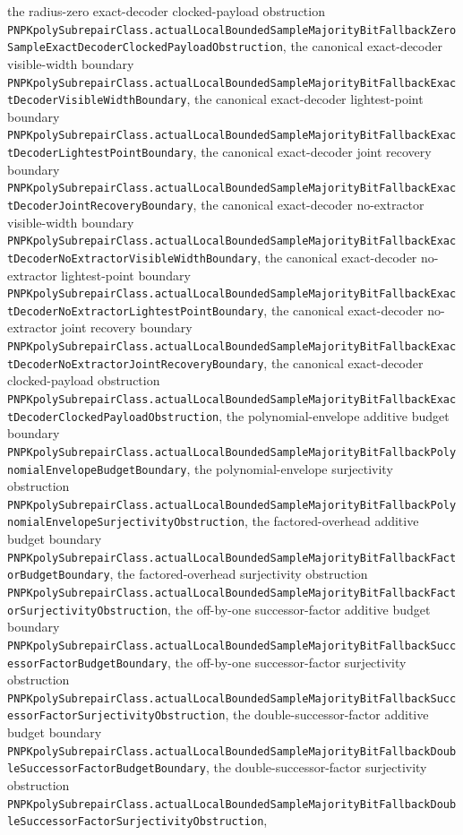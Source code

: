 \documentclass[11pt]{article}
\theoremstyle{remark}
\begin{document}
the radius-zero exact-decoder clocked-payload obstruction
\texttt{PNPKpolySubrepairClass.actualLocalBoundedSampleMajorityBitFallbackZeroSampleExactDecoderClockedPayloadObstruction},
the canonical exact-decoder visible-width boundary
\texttt{PNPKpolySubrepairClass.actualLocalBoundedSampleMajorityBitFallbackExactDecoderVisibleWidthBoundary},
the canonical exact-decoder lightest-point boundary
\texttt{PNPKpolySubrepairClass.actualLocalBoundedSampleMajorityBitFallbackExactDecoderLightestPointBoundary},
the canonical exact-decoder joint recovery boundary
\texttt{PNPKpolySubrepairClass.actualLocalBoundedSampleMajorityBitFallbackExactDecoderJointRecoveryBoundary},
the canonical exact-decoder no-extractor visible-width boundary
\texttt{PNPKpolySubrepairClass.actualLocalBoundedSampleMajorityBitFallbackExactDecoderNoExtractorVisibleWidthBoundary},
the canonical exact-decoder no-extractor lightest-point boundary
\texttt{PNPKpolySubrepairClass.actualLocalBoundedSampleMajorityBitFallbackExactDecoderNoExtractorLightestPointBoundary},
the canonical exact-decoder no-extractor joint recovery boundary
\texttt{PNPKpolySubrepairClass.actualLocalBoundedSampleMajorityBitFallbackExactDecoderNoExtractorJointRecoveryBoundary},
the canonical exact-decoder clocked-payload obstruction
\texttt{PNPKpolySubrepairClass.actualLocalBoundedSampleMajorityBitFallbackExactDecoderClockedPayloadObstruction},
the polynomial-envelope additive budget boundary
\texttt{PNPKpolySubrepairClass.actualLocalBoundedSampleMajorityBitFallbackPolynomialEnvelopeBudgetBoundary},
the polynomial-envelope surjectivity obstruction
\texttt{PNPKpolySubrepairClass.actualLocalBoundedSampleMajorityBitFallbackPolynomialEnvelopeSurjectivityObstruction},
the factored-overhead additive budget boundary
\texttt{PNPKpolySubrepairClass.actualLocalBoundedSampleMajorityBitFallbackFactorBudgetBoundary},
the factored-overhead surjectivity obstruction
\texttt{PNPKpolySubrepairClass.actualLocalBoundedSampleMajorityBitFallbackFactorSurjectivityObstruction},
the off-by-one successor-factor additive budget boundary
\texttt{PNPKpolySubrepairClass.actualLocalBoundedSampleMajorityBitFallbackSuccessorFactorBudgetBoundary},
the off-by-one successor-factor surjectivity obstruction
\texttt{PNPKpolySubrepairClass.actualLocalBoundedSampleMajorityBitFallbackSuccessorFactorSurjectivityObstruction},
the double-successor-factor additive budget boundary
\texttt{PNPKpolySubrepairClass.actualLocalBoundedSampleMajorityBitFallbackDoubleSuccessorFactorBudgetBoundary},
the double-successor-factor surjectivity obstruction
\texttt{PNPKpolySubrepairClass.actualLocalBoundedSampleMajorityBitFallbackDoubleSuccessorFactorSurjectivityObstruction},
\end{document}

